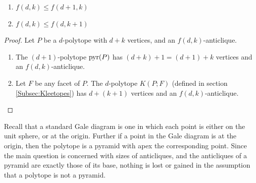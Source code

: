 \begin{Theorem}\ph
    \begin{enumerate}
        \item   \(f(d,k)\le f(d+1,k)\)
        \item   \(f(d,k)\le f(d,k+1)\)
    \end{enumerate}
\end{Theorem}
\begin{proof}
    Let \(P\) be a \(d\)-polytope with \(d+k\) vertices, and an \(f(d,k)\)-anticlique.
        \begin{enumerate}
            \item   The \((d+1)\)-polytope \(\operatorname{pyr}(P)\) has \((d+k)+1=(d+1)+k\) vertices and an \(f(d,k)\)-anticlique.
            \item   Let \(F\) be any facet of \(P\).  The \(d\)-polytope \(K(P;F)\) (defined in section \ref{Subsec:Kleetopes}) has \(d+(k+1)\) vertices and an \(f(d,k)\)-anticlique.
        \end{enumerate}
\end{proof}



Recall that a standard Gale diagram is one in which each point is either on the unit sphere, or at the origin.  Further if a point in the Gale diagram is at the origin, then the polytope is a pyramid with apex the corresponding point.  Since the main question is concerned with sizes of anticliques, and the anticliques of a pyramid are exactly those of its base, nothing is lost or gained in the assumption that a polytope is not a pyramid.

